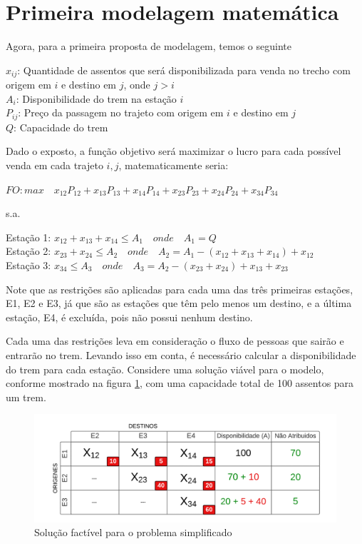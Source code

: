 \section{Primeira modelagem matemática}\label{sec:modelo1}

Agora, para a primeira proposta de modelagem, temos o seguinte

\noindent $x_{ij}$: Quantidade de assentos que será disponibilizada para venda no trecho com origem em $i$ e destino em $j$, onde $j>i$ \\
\noindent $A_i$: Disponibilidade do trem na estação $i$ \\
\noindent $P_{ij}$: Preço da passagem no trajeto com origem em $i$ e destino em $j$ \\
\noindent $Q$: Capacidade do trem

Dado o exposto, a função objetivo será maximizar o lucro para cada possível venda em cada trajeto $i,j$, matematicamente seria:

$FO: max \quad x_{12}P_{12} + x_{13}P_{13} + x_{14}P_{14} + x_{23}P_{23} + x_{24}P_{24} + x_{34}P_{34}$

s.a.

Estação 1: $x_{12} + x_{13} + x_{14} \leq A_1 \quad onde \quad A_1 = Q $ \\
\indent Estação 2: $x_{23} + x_{24}  \leq  A_2 \quad onde \quad A_2 = A_1 - (x_{12} + x_{13} + x_{14}) + x_{12} $ \\ 
\indent Estação 3: $x_{34} \leq A_3 \quad onde \quad A_3 = A_2 - (x_{23} + x_{24}) + x_{13} + x_{23} $

Note que as restrições são aplicadas para cada uma das três primeiras estações, E1, E2 e E3, já que são as estações que têm pelo menos um destino, e a última estação, E4, é excluída, pois não possui nenhum destino.

Cada uma das restrições leva em consideração o fluxo de pessoas que sairão e entrarão no trem. Levando isso em conta, é necessário calcular a disponibilidade do trem para cada estação. Considere uma solução viável para o modelo, conforme mostrado na figura \ref{fig: fig2}, com uma capacidade total de 100 assentos para um trem.

\begin{figure}[!ht]
	\begin{center}
		\includegraphics[scale=0.4]{img/fig2.png}
		\caption{Solução factível para o problema simplificado}
		\label{fig: fig2}
	\end{center}
\end{figure}

